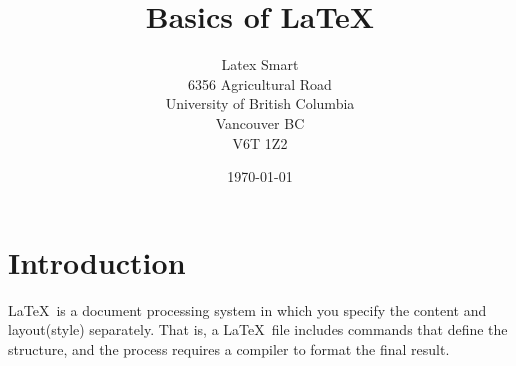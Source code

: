 \documentclass[12pt]{article}
\begin{document}

\title{Basics of \LaTeX} %

\author{Latex Smart \\
         6356 Agricultural Road\\
         University of British Columbia\\
         Vancouver BC \\
         V6T 1Z2}  

\date{\today}
\maketitle


\section{Introduction}
\LaTeX\, is a document processing system in which you specify the content 
and layout(style) separately. That is, a \LaTeX\, file includes commands that
define the structure, and the process requires a compiler to format the final
result.
\end{document}
